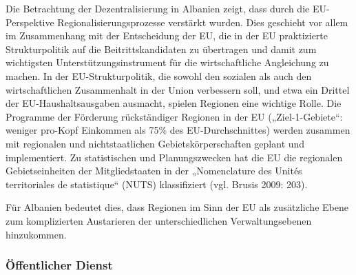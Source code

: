 Die Betrachtung der Dezentralisierung in Albanien zeigt, dass durch die EU-Perspektive Regionalisierungsprozesse verstärkt wurden. Dies geschieht vor allem im Zusammenhang mit der Entscheidung der EU, die in der EU praktizierte Strukturpolitik auf die Beitrittskandidaten zu übertragen und damit zum wichtigsten Unterstützungsinstrument für die wirtschaftliche Angleichung zu machen. In der EU-Strukturpolitik, die sowohl den sozialen als auch den wirtschaftlichen Zusammenhalt in der Union verbessern soll, und etwa ein Drittel der EU-Haushaltsausgaben ausmacht, spielen Regionen eine wichtige Rolle. Die Programme der Förderung rückständiger Regionen in der EU („Ziel-1-Gebiete“: weniger pro-Kopf Einkommen als 75\% des EU-Durchschnittes) werden zusammen mit regionalen und nichtstaatlichen Gebietskörperschaften geplant und implementiert. Zu statistischen und Planungszwecken hat die EU die regionalen Gebietseinheiten der Mitgliedstaaten in der „Nomenclature des Unités territoriales de statistique“ (NUTS) klassifiziert (vgl. Brusis 2009: 203).\par
Für Albanien bedeutet dies, dass Regionen im Sinn der EU als zusätzliche Ebene zum komplizierten Austarieren der unterschiedlichen Verwaltungsebenen hinzukommen.
\subsubsection{Öffentlicher Dienst} 

